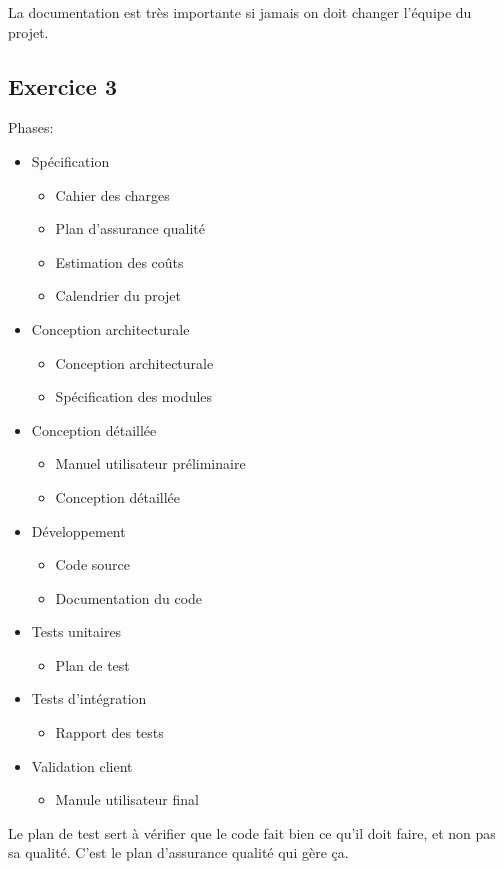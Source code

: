 La documentation est très importante si jamais on doit changer l'équipe du projet.

\subsection{Exercice 3}
Phases:
\begin{itemize}
	\item Spécification
	\begin{itemize}
		\item Cahier des charges
		\item Plan d'assurance qualité
		\item Estimation des coûts
		\item Calendrier du projet
	\end{itemize}
	\item Conception architecturale
	\begin{itemize}
		\item Conception architecturale
		\item Spécification des modules
	\end{itemize}
	\item Conception détaillée
	\begin{itemize}
		\item Manuel utilisateur préliminaire
		\item Conception détaillée
	\end{itemize}
	\item Développement
	\begin{itemize}
		\item Code source
		\item Documentation du code
	\end{itemize}
	\item Tests unitaires
	\begin{itemize}
		\item Plan de test
	\end{itemize}
	\item Tests d'intégration
	\begin{itemize}
		\item Rapport des tests
	\end{itemize}
	\item Validation client
	\begin{itemize}
		\item Manule utilisateur final
	\end{itemize}
\end{itemize}

Le plan de test sert à vérifier que le code fait bien ce qu'il doit faire, et non pas sa qualité. C'est le plan
d'assurance qualité qui gère ça.
